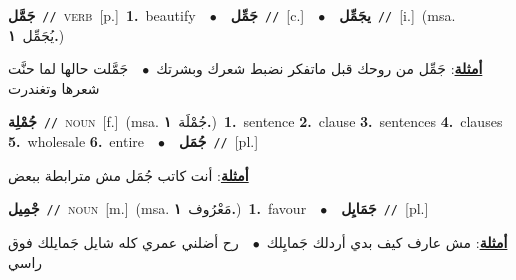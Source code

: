 \documentclass[10pt,a4paper,twoside]{article} %
\begin{document}
\begin{multicols}{2}
{\setlength\topsep{0pt}\textbf{\foreignlanguage{arabic}{جَمَّل}}\ {\color{gray}\texttt{//}\color{black}}\ \textsc{verb}\ [p.]\ \textbf{1.}~beautify\ \ $\bullet$\ \ \setlength\topsep{0pt}\textbf{\foreignlanguage{arabic}{جَمِّل}}\ {\color{gray}\texttt{//}\color{black}}\ [c.]\ \ $\bullet$\ \ \setlength\topsep{0pt}\textbf{\foreignlanguage{arabic}{يجَمِّل}}\ {\color{gray}\texttt{//}\color{black}}\ [i.]\ \color{gray}(msa. \foreignlanguage{arabic}{يُجَمِّل}~\foreignlanguage{arabic}{\textbf{١.}})\color{black}\  \begin{flushright}\color{gray}\foreignlanguage{arabic}{\textbf{\underline{\foreignlanguage{arabic}{أمثلة}}}: جَمِّل من روحك قبل ماتفكر نضبط شعرك وبشرتك\ $\bullet$\ \  جَمَّلت حالها لما حنَّت شعرها وتغندرت}\end{flushright}\color{black}} \vspace{2mm}

{\setlength\topsep{0pt}\textbf{\foreignlanguage{arabic}{جُمْلِة}}\ {\color{gray}\texttt{//}\color{black}}\ \textsc{noun}\ [f.]\ \color{gray}(msa. \foreignlanguage{arabic}{جُمْلَة}~\foreignlanguage{arabic}{\textbf{١.}})\color{black}\ \textbf{1.}~sentence  \textbf{2.}~clause  \textbf{3.}~sentences  \textbf{4.}~clauses  \textbf{5.}~wholesale  \textbf{6.}~entire\ \ $\bullet$\ \ \setlength\topsep{0pt}\textbf{\foreignlanguage{arabic}{جُمَل}}\ {\color{gray}\texttt{//}\color{black}}\ [pl.]\  \begin{flushright}\color{gray}\foreignlanguage{arabic}{\textbf{\underline{\foreignlanguage{arabic}{أمثلة}}}: أنت كاتب جُمَل مش مترابطة ببعض}\end{flushright}\color{black}} \vspace{2mm}

{\setlength\topsep{0pt}\textbf{\foreignlanguage{arabic}{جْمِيل}}\ {\color{gray}\texttt{//}\color{black}}\ \textsc{noun}\ [m.]\ \color{gray}(msa. \foreignlanguage{arabic}{مَعْرُوف}~\foreignlanguage{arabic}{\textbf{١.}})\color{black}\ \textbf{1.}~favour\ \ $\bullet$\ \ \setlength\topsep{0pt}\textbf{\foreignlanguage{arabic}{جَمَايِل}}\ {\color{gray}\texttt{//}\color{black}}\ [pl.]\  \begin{flushright}\color{gray}\foreignlanguage{arabic}{\textbf{\underline{\foreignlanguage{arabic}{أمثلة}}}: مش عارف كيف بدي أردلك جَمايِلك\ $\bullet$\ \  رح أضلني عمري كله شايل جَمايلك فوق راسي}\end{flushright}\color{black}} \vspace{2mm}


\end{multicols}
\end{document}
